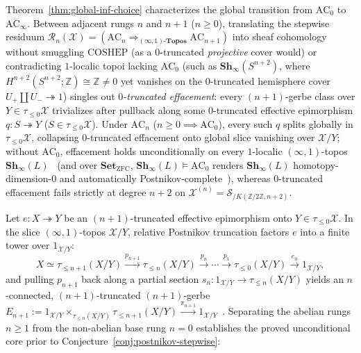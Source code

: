 \documentclass[10pt,twoside,openright]{book}
\theoremstyle{crmplain}
\theoremstyle{crmdef}
\theoremstyle{crmremark}
\begin{document}
Theorem~\ref{thm:global-inf-choice} characterizes the global transition from $\mathrm{AC}_0$ to $\mathrm{AC}_\infty$. Between adjacent rungs $n$ and $n+1$ ($n \ge 0$), translating the stepwise residuum $\mathcal{R}_n(\mathcal{X}) = (\mathrm{AC}_n \Rightarrow_{(\infty,1)\text{-}\mathbf{Topos}} \mathrm{AC}_{n+1})$ into sheaf cohomology without smuggling $\mathrm{COSHEP}$ (as a $0$-truncated \emph{projective} cover would) or contradicting $1$-localic topoi lacking $\mathrm{AC}_0$ (such as $\mathbf{Sh}_\infty(S^{n+2})$, where $H^{n+2}(S^{n+2}; \mathbb{Z}) \cong \mathbb{Z} \neq 0$ yet vanishes on the $0$-truncated hemisphere cover $U_+ \amalg U_- \twoheadrightarrow 1$) singles out \emph{$0$-truncated effacement}: every $(n+1)$-gerbe class over $Y \in \tau_{\le 0}\mathcal{X}$ trivializes after pullback along some $0$-truncated effective epimorphism $q : S \twoheadrightarrow Y$ ($S \in \tau_{\le 0}\mathcal{X}$). Under $\mathrm{AC}_n$ ($n \ge 0 \implies \mathrm{AC}_0$), every such $q$ splits globally in $\tau_{\le 0}\mathcal{X}$, collapsing $0$-truncated effacement onto global slice vanishing over $\mathcal{X}/Y$; without $\mathrm{AC}_0$, effacement holds unconditionally on every $1$-localic $(\infty, 1)$-topos $\mathbf{Sh}_\infty(L)$~\cite[\S6.4.5]{Lurie09} (and over $\mathbf{Set}_{\mathrm{ZFC}}$, $\mathbf{Sh}_\infty(L) \models \mathrm{AC}_0$ renders $\mathbf{Sh}_\infty(L)$ homotopy-dimension-$0$ and automatically Postnikov-complete~\cite[Corollary~7.2.1.12]{Lurie09}), whereas $0$-truncated effacement fails strictly at degree $n+2$ on $\mathcal{X}^{(n)} = \mathcal{S}_{/K(\mathbb{Z}/2\mathbb{Z}, n+2)}$.

Let $e: X \twoheadrightarrow Y$ be an $(n+1)$-truncated effective epimorphism onto $Y \in \tau_{\le 0}\mathcal{X}$. In the slice $(\infty, 1)$-topos $\mathcal{X}/Y$, relative Postnikov truncation factors $e$ into a finite tower over $1_{\mathcal{X}/Y}$:
\[
  X \simeq \tau_{\le n+1}(X/Y) \xrightarrow{p_{n+1}} \tau_{\le n}(X/Y) \xrightarrow{p_n} \cdots \xrightarrow{p_1} \tau_{\le 0}(X/Y) \xrightarrow{e_0} 1_{\mathcal{X}/Y},
\]
and pulling $p_{n+1}$ back along a partial section $s_n : 1_{\mathcal{X}/Y} \to \tau_{\le n}(X/Y)$ yields an $n$-connected, $(n+1)$-truncated $(n+1)$-gerbe $E_{n+1} := 1_{\mathcal{X}/Y} \times_{\tau_{\le n}(X/Y)} \tau_{\le n+1}(X/Y) \xrightarrow{\pi_{n+1}} 1_{\mathcal{X}/Y}$~\cite[Def.~7.2.2.20]{Lurie09}. Separating the abelian rungs $n \ge 1$ from the non-abelian base rung $n = 0$ establishes the proved unconditional core prior to Conjecture~\ref{conj:postnikov-stepwise}:
\end{document}

